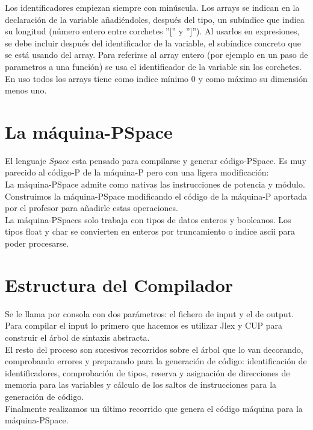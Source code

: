 \documentclass[a4paper, 12pt]{article}
\begin{document}
Los identificadores empiezan siempre con minúscula. Los arrays se indican en la declaración de la variable añadiéndoles, después del tipo, un subíndice que indica su longitud (número entero entre corchetes ''['' y '']''). Al usarlos en expresiones, se debe incluir después del identificador de la variable, el subíndice concreto que se está usando del array. Para referirse al array entero (por ejemplo en un paso de parametros a una función) se usa el identificador de la variable sin los corchetes. En uso todos los arrays tiene como indice mínimo 0 y como máximo su dimensión menos uno.


\section{La máquina-PSpace}

El lenguaje \textit{Space} esta pensado para compilarse y generar código-PSpace. Es muy parecido al código-P de la máquina-P pero con una ligera modificación:\\

La máquina-PSpace admite como nativas las instrucciones de potencia y módulo. Construimos la máquina-PSpace modificando el código de la máquina-P aportada por el profesor para añadirle estas operaciones.\\

La máquina-PSpaces solo trabaja con tipos de datos enteros y booleanos. Los tipos float y char se convierten en enteros por truncamiento o indice ascii para poder procesarse.

\section{Estructura del Compilador}

Se le llama por consola con dos parámetros: el fichero de input y el de output.\\

Para compilar el input lo primero que hacemos es utilizar Jlex y CUP para construir el árbol de sintaxis abstracta.	\\

El resto del proceso son sucesivos recorridos sobre el árbol que lo van decorando, comprobando errores y preparando para la generación de código: identificación de identificadores, comprobación de tipos, reserva y asignación de direcciones de memoria para las variables y cálculo de los saltos de instrucciones para la generación de código.\\

Finalmente realizamos un último recorrido que genera el código máquina para la máquina-PSpace.
 
\end{document}
